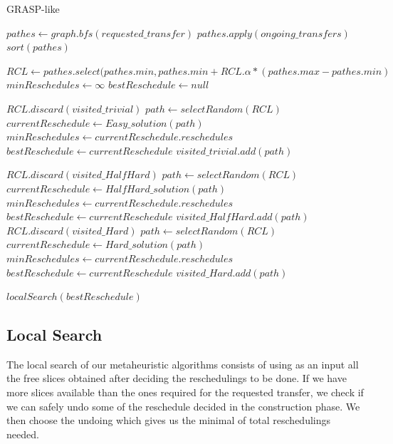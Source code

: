 \documentclass[11pt,a4paper]{article}
\begin{document}
\begin{algorithm}[H]
\caption{GRASP-like}\label{grasp}
\begin{algorithmic}[1]
	\State $pathes \gets graph.bfs(requested\_transfer)$
	\State $pathes.apply(ongoing\_transfers)$
	\State $sort(pathes)$

	\State $RCL \gets pathes.select(pathes.min, pathes.min+RCL.\alpha*(pathes.max-pathes.min)$
	\State $minReschedules \gets \infty$
	\State $bestReschedule \gets null$

		\State $RCL.discard(visited\_trivial)$
		\State $path \gets selectRandom(RCL)$
		\State $currentReschedule \gets Easy\_solution(path)$
			\State $minReschedules \gets currentReschedule.reschedules$
			\State $bestReschedule \gets currentReschedule$
		\EndIf
		\State $visited\_trivial.add(path)$
	\EndFor

			\State $RCL.discard(visited\_HalfHard)$
			\State $path \gets selectRandom(RCL)$
			\State $currentReschedule \gets HalfHard\_solution(path)$
				\State $minReschedules \gets currentReschedule.reschedules$
				\State $bestReschedule \gets currentReschedule$
			\EndIf
			\State $visited\_HalfHard.add(path)$
		\EndFor
			\State $RCL.discard(visited\_Hard)$
			\State $path \gets selectRandom(RCL)$
			\State $currentReschedule \gets Hard\_solution(path)$
				\State $minReschedules \gets currentReschedule.reschedules$
				\State $bestReschedule \gets currentReschedule$
			\EndIf
			\State $visited\_Hard.add(path)$
		\EndFor

		\State $localSearch(bestReschedule)$
	\EndIf
\EndProcedure
\end{algorithmic}
\end{algorithm}

\subsection{Local Search}

The local search of our metaheuristic algorithms consists of using as an input all the free slices obtained after deciding the reschedulings to be done. If we have more slices available than the ones required for the requested transfer, we check if we can safely undo some of the reschedule decided in the construction phase. We then choose the undoing which gives us the minimal of total reschedulings needed.\\
\end{document}
